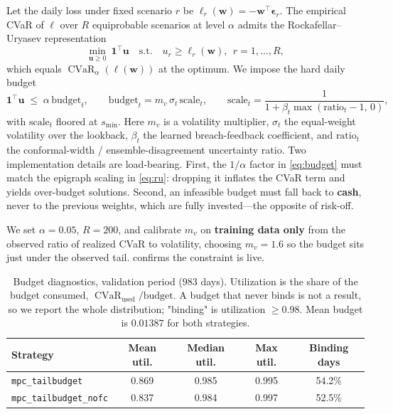 \documentclass[journal]{IEEEtran}
\DeclareMathOperator{\CVaR}{\mathrm{CVaR}}
\newcommand{\w}{\mathbf{w}}
\newcommand{\eps}{\boldsymbol{\epsilon}}
\begin{document}
Let the daily loss under fixed scenario $r$ be
$\ell_r(\w)=-\w^\top\eps_r$. The empirical CVaR of $\ell$ over $R$ equiprobable
scenarios at level $\alpha$ admits the Rockafellar--Uryasev representation
\begin{equation}
\label{eq:ru}
\min_{\mathbf{u}\ge 0}\ \mathbf{1}^\top\mathbf{u}
\quad\text{s.t.}\quad
u_r \ge \ell_r(\w),\ \ r=1,\dots,R,
\end{equation}
which equals $\CVaR_\alpha(\ell(\w))$ at the optimum. We impose the hard daily
budget
\begin{equation}
\label{eq:budget}
\mathbf{1}^\top\mathbf{u} \;\le\; \alpha\,\text{budget}_t,
\qquad
\text{budget}_t = m_v\,\sigma_t\,\text{scale}_t,
\qquad
\text{scale}_t = \frac{1}{1+\beta_t\max(\text{ratio}_t-1,\,0)},
\end{equation}
with $\text{scale}_t$ floored at $s_{\min}$. Here $m_v$ is a volatility
multiplier, $\sigma_t$ the equal-weight volatility over the lookback, $\beta_t$ the
learned breach-feedback coefficient, and $\text{ratio}_t$ the conformal-width /
ensemble-disagreement uncertainty ratio. Two implementation details are
load-bearing. First, the $1/\alpha$ factor in \cref{eq:budget} must match the
epigraph scaling in \cref{eq:ru}: dropping it inflates the CVaR term and yields
over-budget solutions. Second, an infeasible budget must fall back to
\textbf{cash}, never to the previous weights, which are fully invested---the
opposite of risk-off.

We set $\alpha=0.05$, $R=200$, and calibrate $m_v$ on \textbf{training data only}
from the observed ratio of realized CVaR to volatility, choosing $m_v=1.6$ so the
budget sits just under the observed tail.  confirms the
constraint is live.

\begin{table}[!t]
  \centering
  \caption{Budget diagnostics, validation period ($983$ days). Utilization is the
  share of the budget consumed, $\CVaR_{\text{used}}/\text{budget}$. A budget that
  never binds is not a result, so we report the whole distribution; "binding" is
  utilization $\ge 0.98$. Mean budget is $0.01387$ for both strategies.}
  \label{tab:budgetdiag}
  \begin{tabular}{lcccc}
    \toprule
    Strategy & Mean util. & Median util. & Max util. & Binding days \\
    \midrule
    \texttt{mpc\_tailbudget}        & 0.869 & 0.985 & 0.995 & 54.2\% \\
    \texttt{mpc\_tailbudget\_nofc}  & 0.837 & 0.984 & 0.997 & 52.5\% \\
    \bottomrule
  \end{tabular}
\end{table}
\end{document}
